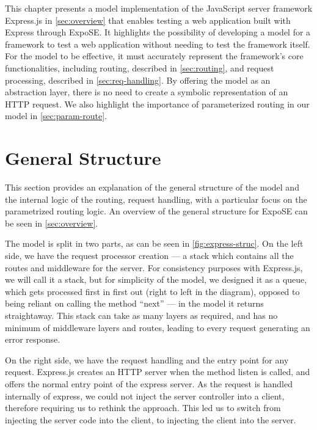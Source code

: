 This chapter presents a model implementation of the JavaScript server framework Express.js in \autoref{sec:overview} that enables testing a web application built with Express through ExpoSE. It highlights the possibility of developing a model for a framework to test a web application without needing to test the framework itself. For the model to be effective, it must accurately represent the framework's core functionalities, including routing, described in \autoref{sec:routing}, and request processing, described in \autoref{sec:req-handling}. By offering the model as an abstraction layer, there is no need to create a symbolic representation of an HTTP request. We also highlight the importance of parameterized routing in our model in \autoref{sec:param-route}.

\section{General Structure}

This section provides an explanation of the general structure of the model and the internal logic of the routing, request handling, with a particular focus on the parametrized routing logic. An overview of the general structure for ExpoSE can be seen in \autoref{sec:overview}.

The model is split in two parts, as can be seen in \autoref{fig:express-struc}. On the left side, we have the request processor creation — a stack which contains all the routes and middleware for the server. For consistency purposes with Express.js, we will call it a stack, but for simplicity of the model, we designed it as a queue, which gets processed first in first out (right to left in the diagram), opposed to being reliant on calling the method “next” — in the model it returns straightaway. 
This stack can take as many layers as required, and has no minimum of middleware layers and routes, leading to every request generating an error response. 



On the right side, we have the request handling and the entry point for any request. 
Express.js creates an HTTP server when the method listen is called, and offers the normal entry point of the express server. As the request is handled internally of express, we could not inject the server controller into a client, therefore requiring us to rethink the approach. This led us to switch from injecting the server code into the client, to injecting the client into the server. 

